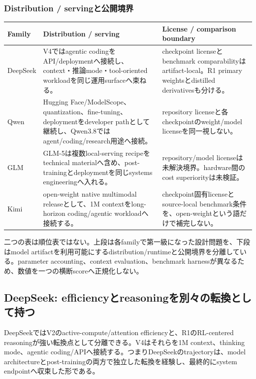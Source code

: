 \documentclass[lualatex,a4paper,10pt]{jlreq}
\begin{document}
\subsubsection*{Distribution / servingと公開境界}
\small
\setlength{\tabcolsep}{4pt}
\begin{tabularx}{\textwidth}{@{}>{\raggedright\arraybackslash}p{}>{\raggedright\arraybackslash}p{}>{\raggedright\arraybackslash}X@{}}
\toprule
Family & Distribution / serving & License / comparison boundary \\
\midrule
DeepSeek & V4ではagentic codingをAPI/deploymentへ接続し、context・推論mode・tool-oriented workloadを同じ運用surfaceへ束ねる。 & checkpoint licenseとbenchmark comparabilityはartifact-local。R1 primary weightsとdistilled derivativesも分ける。 \\
Qwen & Hugging Face/ModelScope、quantization、fine-tuning、deploymentをdeveloper pathとして継続し、Qwen3.8ではagent/coding/research用途へ接続。 & repository licenseと各checkpointのweight/model licenseを同一視しない。 \\
GLM & GLM-5は複数local-serving recipeをtechnical materialへ含め、post-trainingとdeploymentを同じsystems engineeringへ入れる。 & repository/model licenseは未解決境界。hardware間のcost superiorityは未検証。 \\
Kimi & open-weight native multimodal releaseとして、1M contextをlong-horizon coding/agentic workloadへ接続する。 & checkpoint固有licenseとsource-local benchmark条件を、open-weightという語だけで補完しない。 \\
\bottomrule
\end{tabularx}
\normalsize
\setlength{\tabcolsep}{6pt}

二つの表は順位表ではない。上段は各familyで第一級になった設計問題を、下段はmodel artifactを利用可能にするdistribution/runtimeと公開境界を分離している。parameter accounting、context evaluation、benchmark harnessが異なるため、数値を一つの横断scoreへ正規化しない。


\subsection{DeepSeek: efficiencyとreasoningを別々の転換として持つ}
DeepSeekではV2のactive-compute/attention efficiencyと、R1のRL-centered reasoningが強い転換点として分離できる。V4はそれらを1M context、thinking mode、agentic coding/APIへ接続する。つまりDeepSeekのtrajectoryは、model architectureとpost-trainingの両方で独立した転換を経験し、最終的にsystem endpointへ収束した形である。\autocite{deepseekv2,deepseekr1,deepseekv4}
\end{document}
